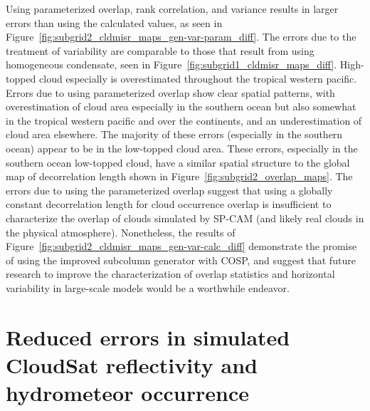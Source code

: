 Using parameterized overlap, rank correlation, and variance results in
larger errors than using the calculated values, as seen in
Figure~\ref{fig:subgrid2_cldmisr_maps_gen-var-param_diff}. The errors
due to the treatment of variability are comparable to those that result
from using homogeneous condensate, seen in
Figure~\ref{fig:subgrid1_cldmisr_maps_diff}. High-topped cloud
especially is overestimated throughout the tropical western pacific.
Errors due to using parameterized overlap show clear spatial patterns,
with overestimation of cloud area especially in the southern ocean but
also somewhat in the tropical western pacific and over the continents,
and an underestimation of cloud area elsewhere. The majority of these
errors (especially in the southern ocean) appear to be in the low-topped
cloud area. These errors, especially in the southern ocean low-topped
cloud, have a similar spatial structure to the global map of
decorrelation length shown in Figure~\ref{fig:subgrid2_overlap_maps}.
The errors due to using the parameterized overlap suggest that using a
globally constant decorrelation length for cloud occurrence overlap is
insufficient to characterize the overlap of clouds simulated by SP-CAM
(and likely real clouds in the physical atmosphere). Nonetheless, the
results of Figure~\ref{fig:subgrid2_cldmisr_maps_gen-var-calc_diff}
demonstrate the promise of using the improved subcolumn generator with
COSP, and suggest that future research to improve the characterization
of overlap statistics and horizontal variability in large-scale models
would be a worthwhile endeavor.

\section{Reduced errors in simulated CloudSat reflectivity and
hydrometeor occurrence}\label{sec:subgrid2ux5factiveux5fresults}


